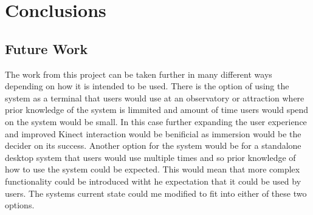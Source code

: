 \chapter{Conclusions}\label{C:con}
\section{Future Work}
The work from this project can be taken further in many different ways depending on how it is intended to be used. There is the option of using the system as a terminal that users would use at an observatory or attraction where prior knowledge of the system is limmited and amount of time users would spend on the system would be small. In this case further expanding the user experience and improved Kinect interaction would be benificial as immersion would be the decider on its success. Another option for the system would be for a standalone desktop system that users would use multiple times and so prior knowledge of how to use the system could be expected. This would mean that more complex functionality could be introduced witht he expectation that it could be used by users. The systems current state could me modified to fit into either of these two options.
